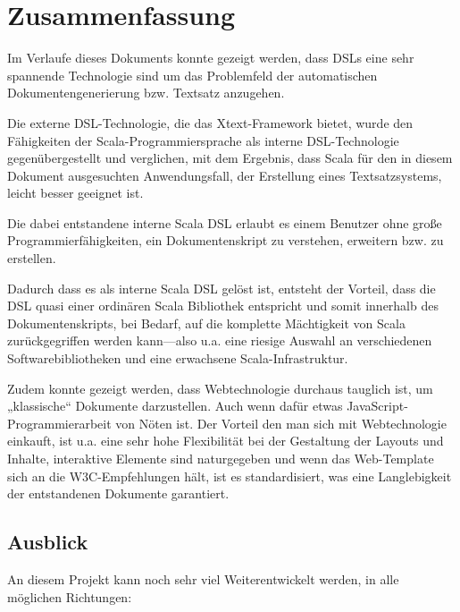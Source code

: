 \chapter{Zusammenfassung}

Im Verlaufe dieses Dokuments konnte gezeigt werden, dass DSLs eine sehr
spannende Technologie sind um das Problemfeld der automatischen
Dokumentengenerierung bzw. Textsatz anzugehen.

Die externe DSL-Technologie, die das Xtext-Framework bietet,
wurde den Fähigkeiten der Scala-Programmiersprache als interne DSL-Technologie gegenübergestellt und verglichen,
mit dem Ergebnis, dass Scala für den in diesem Dokument ausgesuchten
Anwendungsfall, der Erstellung eines Textsatzsystems,
leicht besser geeignet ist.

Die dabei entstandene interne Scala DSL erlaubt es einem Benutzer ohne große Programmierfähigkeiten, ein Dokumentenskript zu verstehen, erweitern
bzw. zu erstellen.

Dadurch dass es als interne Scala DSL gelöst ist, entsteht der Vorteil,
dass die DSL quasi einer ordinären Scala Bibliothek entspricht und
somit innerhalb des Dokumentenskripts, bei Bedarf,
auf die komplette Mächtigkeit von Scala
zurückgegriffen werden kann---also u.a. eine riesige Auswahl an verschiedenen
Softwarebibliotheken und eine erwachsene Scala-Infrastruktur.

Zudem konnte gezeigt werden, dass Webtechnologie durchaus tauglich ist, um
„klassische“ Dokumente darzustellen. Auch wenn dafür etwas
JavaScript-Programmierarbeit von Nöten ist. Der Vorteil den man sich mit
Webtechnologie einkauft, ist u.a. eine sehr hohe Flexibilität bei der
Gestaltung der Layouts und Inhalte, interaktive Elemente sind naturgegeben
und wenn das Web-Template sich an die W3C-Empfehlungen hält, ist es
standardisiert, was eine Langlebigkeit der entstandenen Dokumente garantiert.

\section{Ausblick}

An diesem Projekt kann noch sehr viel Weiterentwickelt werden, in alle
möglichen Richtungen:

